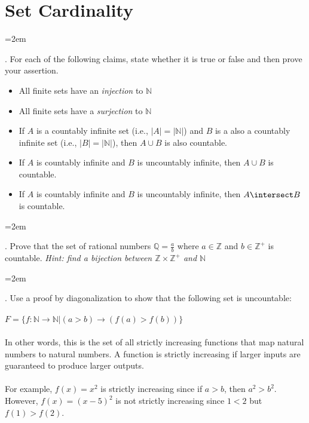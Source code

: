 \documentclass[12pt]{article}
\def\homework{Set Cardinality}
\newcounter{quesnum}
\newcommand{\question}[2][??]{
\begin{list}{\labelitemi}{\leftmargin=2em}
\item [\arabic{quesnum}.] {} {#2}
\end{list}
\addtocounter{quesnum}{1}
}
\begin{document}
\section*{\homework}


\question[3]{
For each of the following claims, state whether it is true or false and then prove your assertion.
}

\begin{itemize}
	\item All finite sets have an \emph{injection} to $\mathbb{N}$
	\item All finite sets have a \emph{surjection} to $\mathbb{N}$
	\item If $A$ is a countably infinite set (i.e., $|A|=|\mathbb{N}|$) and $B$ is a also a countably infinite set (i.e., $|B| = |\mathbb{N}|$), then $A \cup B$ is also countable.
	\item If $A$ is countably infinite and $B$ is uncountably infinite, then $A \cup B$ is countable.
	\item If $A$ is countably infinite and $B$ is uncountably infinite, then $A \intersect B$ is countable.
\end{itemize}

\vspace{12pt}



\question[3]{
Prove that the set of rational numbers $\mathbb{Q}=\frac{a}{b}$ where $a \in \mathbb{Z}$ and $b \in \mathbb{Z}^+$ is countable. \emph{Hint: find a bijection between $\mathbb{Z} \times \mathbb{Z}^+$ and $\mathbb{N}$}
}

\vspace{12pt}

\question[3]{
Use a proof by diagonalization to show that the following set is uncountable:\\
\\
$F=\{ f:\mathbb{N} \rightarrow \mathbb{N} | (a>b) \rightarrow (f(a) > f(b)) \}$
\\
\\
In other words, this is the set of all strictly increasing functions that map natural numbers to natural numbers. A function is strictly increasing if larger inputs are guaranteed to produce larger outputs.\\
\\
For example, $f(x)=x^2$ is strictly increasing since if $a>b$, then $a^2>b^2$. However, $f(x)=(x-5)^2$ is not strictly increasing since $1<2$ but $f(1) > f(2)$.
}

\vspace{12pt}
\end{document}
